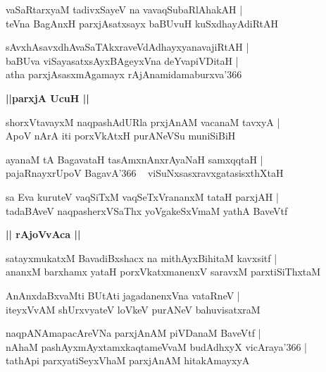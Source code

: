 \documentclass[twoside,12pt,openright]{book}
\newcounter{shloka}[chapter]
\def\uvaca#1{\centerline{{\large\textbf{#1}}}}
\begin{document}
\begin{shloka}%
vaSaRtarxyaM tadivxSayeV na vavaqSubaRlAhakAH |\\
teVna BagAnxH parxjAsatxsayx baBUvuH kuSxdhayAdiRtAH
\end{shloka}

\begin{shloka}%
sAvxhAsavxdhAvaSaTAkxraveVdAdhayxyanavajiRtAH |\\
baBUva viSayasatxsAyxBAgeyxVna deYvapiVDitaH |\\
atha parxjAsasxmAgamayx rAjAnamidamaburxva\char'366
\end{shloka}

\uvaca{ ||parxjA UcuH || }

\begin{shloka}%
shorxVtavayxM naqpashAdURla prxjAnAM vacanaM tavxyA |\\
ApoV nArA iti porxVkAtxH purANeVSu muniSiBiH
\end{shloka}

\begin{shloka}%
ayanaM tA BagavataH tasAmxnAnxrAyaNaH samxqqtaH |\\
pajaRnayxrUpoV BagavA\char'366 ~ viSuNxsasxravxgatasisxthXtaH
\end{shloka}

\begin{shloka}%
sa Eva kuruteV vaqSiTxM vaqSeTxVrananxM tataH parxjAH |\\
tadaBAveV naqpasherxVSaThx yoVgakeSxVmaM yathA BaveVtf 
\end{shloka}

\uvaca{|| rAjoVvAca ||}

\begin{shloka}%
satayxmukatxM BavadiBxshacx na mithAyxBihitaM kavxsitf |\\
ananxM barxhamx yataH porxVkatxmanenxV saravxM parxtiSiThxtaM
\end{shloka}

\begin{shloka}%
AnAnxdaBxvaMti BUtAti jagadanenxVna vataRneV |\\
iteyxVvAM shUrxvyateV loVkeV purANeV bahuvisatxraM 
\end{shloka}

\begin{shloka}%
naqpANAmapacAreVNa parxjAnAM piVDanaM BaveVtf |\\
nAhaM pashAyxmAyxtamxkaqtameVvaM budAdhxyX vicAraya\char'366 |\\
tathApi parxyatiSeyxVhaM parxjAnAM hitakAmayxyA
\end{shloka}
\end{document}
